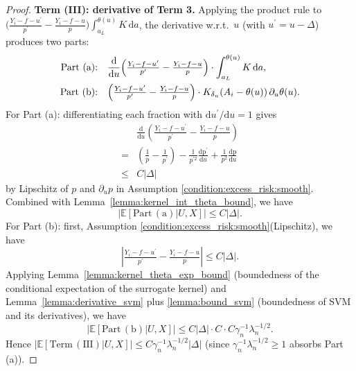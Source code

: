 \documentclass[12pt]{article}
\newcommand{\E}{\mathbb{E}}
\begin{document}
\begin{proof}
\noindent\textbf{Term (III): derivative of Term 3.}
Applying the product rule to $\bigl(\tfrac{Y_i-f-u^\prime}{p^\prime}-\tfrac{Y_i-f-u}{p}\bigr)\int_{a_L}^{\theta(u)}K\,\mathrm{d}a$, the derivative w.r.t.\ $u$ (with $u^\prime=u-\Delta$) produces two parts:
\begin{align*}
\text{Part (a):}&\quad\frac{\mathrm{d}}{\mathrm{d}u}\Bigl(\tfrac{Y_i-f-u^\prime}{p^\prime}-\tfrac{Y_i-f-u}{p}\Bigr)\cdot\int_{a_L}^{\theta(u)}K\,\mathrm{d}a,\\
\text{Part (b):}&\quad\Bigl(\tfrac{Y_i-f-u^\prime}{p^\prime}-\tfrac{Y_i-f-u}{p}\Bigr)\cdot K_{\delta_n}(A_i-\theta(u))\,\partial_u\theta(u).
\end{align*}
For Part (a): differentiating each fraction with $\mathrm{d}u^\prime/\mathrm{d}u=1$ gives 
\begin{align*}
    &\tfrac{\mathrm{d}}{\mathrm{d}u}(\tfrac{Y_i-f-u^\prime}{p^\prime}-\tfrac{Y_i-f-u}{p})\\
    =&(\tfrac{1}{p}-\tfrac{1}{p^\prime})- \tfrac{1}{p^{\prime2}}\tfrac{\mathrm{d p^\prime}}{\mathrm{d}u} +\tfrac{1}{p^{2}}\tfrac{\mathrm{d p}}{\mathrm{d}u} \\
    \leq & C|\Delta|
\end{align*}
 by Lipschitz of $p$ and $\partial_u p$ in Assumption \ref{condition:excess_risk:smooth}. Combined with Lemma~\ref{lemma:kernel_int_theta_bound}, we have $$\left|\E[\mathrm{Part\,(a)}|U,X]\right|\leq C|\Delta|.$$
For Part (b): first, Assumption \ref{condition:excess_risk:smooth}(Lipschitz), we have
$$|\tfrac{Y_i-f-u^\prime}{p^\prime}-\tfrac{Y_i-f-u}{p}|\leq C|\Delta|.$$ Applying Lemma~\ref{lemma:kernel_theta_exp_bound} (boundedness of the conditional expectation of the surrogate kernel) and Lemma~\ref{lemma:derivative_svm} plus \ref{lemma:bound_svm} (boundedness of SVM and its derivatives), we have $$\left|\E[\mathrm{Part\,(b)}|U,X]\right|\leq C|\Delta|\cdot C\cdot C\gamma_n^{-1}\lambda_n^{-1/2}.$$
Hence $\left|\E[\mathrm{Term\,(III)}|U,X]\right|\leq C\gamma_n^{-1}\lambda_n^{-1/2}|\Delta|$ (since $\gamma_n^{-1}\lambda_n^{-1/2}\geq 1$ absorbs Part (a)).


\end{proof}
\end{document}
